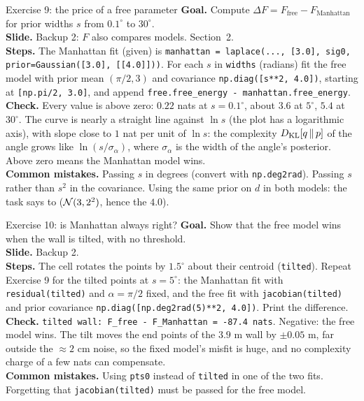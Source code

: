 \documentclass[11pt]{article}
\begin{document}
\begin{labhelp}{Exercise 9: the price of a free parameter}
\textbf{Goal.} Compute $\Delta F=F_{\text{free}}-F_{\text{Manhattan}}$ for prior widths $s$ from $0.1^\circ$ to $30^\circ$.\\
\textbf{Slide.} Backup 2: $F$ also compares models. Section~2.\\
\textbf{Steps.} The Manhattan fit (given) is \texttt{manhattan = laplace(..., [3.0], sig0, prior=Gaussian([3.0], [[4.0]]))}. For each $s$ in \texttt{widths} (radians) fit the free model with prior mean $(\pi/2, 3)$ and covariance \texttt{np.diag([s**2, 4.0])}, starting at \texttt{[np.pi/2, 3.0]}, and append \texttt{free.free\_energy - manhattan.free\_energy}.\\
\textbf{Check.} Every value is above zero: $0.22$ nats at $s=0.1^\circ$, about $3.6$ at $5^\circ$, $5.4$ at $30^\circ$. The curve is nearly a straight line against $\ln s$ (the plot has a logarithmic axis), with slope close to $1$ nat per unit of $\ln s$: the complexity $D_{\mathrm{KL}}\!\left[q\,\middle\|\,p\right]$ of the angle grows like $\ln(s/\sigma_\alpha)$, where $\sigma_\alpha$ is the width of the angle's posterior. Above zero means the Manhattan model wins.\\
\textbf{Common mistakes.} Passing $s$ in degrees (convert with \texttt{np.deg2rad}). Passing $s$ rather than $s^2$ in the covariance. Using the same prior on $d$ in both models: the task says to ($\mathcal{N}(3,2^2)$, hence the $4.0$).
\end{labhelp}

\begin{labhelp}{Exercise 10: is Manhattan always right?}
\textbf{Goal.} Show that the free model wins when the wall is tilted, with no threshold.\\
\textbf{Slide.} Backup 2.\\
\textbf{Steps.} The cell rotates the points by $1.5^\circ$ about their centroid (\texttt{tilted}). Repeat Exercise 9 for the tilted points at $s=5^\circ$: the Manhattan fit with \texttt{residual(tilted)} and $\alpha=\pi/2$ fixed, and the free fit with \texttt{jacobian(tilted)} and prior covariance \texttt{np.diag([np.deg2rad(5)**2, 4.0])}. Print the difference.\\
\textbf{Check.} \texttt{tilted wall: F\_free - F\_Manhattan = -87.4 nats}. Negative: the free model wins. The tilt moves the end points of the $3.9$ m wall by $\pm0.05$ m, far outside the $\approx2$ cm noise, so the fixed model's misfit is huge, and no complexity charge of a few nats can compensate.\\
\textbf{Common mistakes.} Using \texttt{pts0} instead of \texttt{tilted} in one of the two fits. Forgetting that \texttt{jacobian(tilted)} must be passed for the free model.
\end{labhelp}
\end{document}
